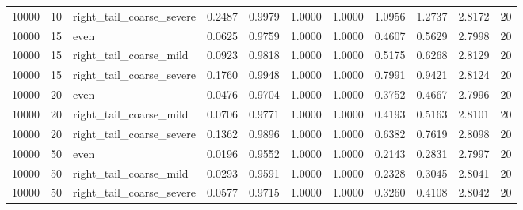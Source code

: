 \begin{table}[!h]
{\begin{tabular}[t]{rrlrrrrrrrr}
10000 & 10 & right\_tail\_coarse\_severe & 0.2487 & 0.9979 & 1.0000 & 1.0000 & 1.0956 & 1.2737 & 2.8172 & 20\\
10000 & 15 & even & 0.0625 & 0.9759 & 1.0000 & 1.0000 & 0.4607 & 0.5629 & 2.7998 & 20\\
10000 & 15 & right\_tail\_coarse\_mild & 0.0923 & 0.9818 & 1.0000 & 1.0000 & 0.5175 & 0.6268 & 2.8129 & 20\\
10000 & 15 & right\_tail\_coarse\_severe & 0.1760 & 0.9948 & 1.0000 & 1.0000 & 0.7991 & 0.9421 & 2.8124 & 20\\
10000 & 20 & even & 0.0476 & 0.9704 & 1.0000 & 1.0000 & 0.3752 & 0.4667 & 2.7996 & 20\\
10000 & 20 & right\_tail\_coarse\_mild & 0.0706 & 0.9771 & 1.0000 & 1.0000 & 0.4193 & 0.5163 & 2.8101 & 20\\
10000 & 20 & right\_tail\_coarse\_severe & 0.1362 & 0.9896 & 1.0000 & 1.0000 & 0.6382 & 0.7619 & 2.8098 & 20\\
10000 & 50 & even & 0.0196 & 0.9552 & 1.0000 & 1.0000 & 0.2143 & 0.2831 & 2.7997 & 20\\
10000 & 50 & right\_tail\_coarse\_mild & 0.0293 & 0.9591 & 1.0000 & 1.0000 & 0.2328 & 0.3045 & 2.8041 & 20\\
10000 & 50 & right\_tail\_coarse\_severe & 0.0577 & 0.9715 & 1.0000 & 1.0000 & 0.3260 & 0.4108 & 2.8042 & 20\\
\bottomrule
\end{tabular}}
\end{table}